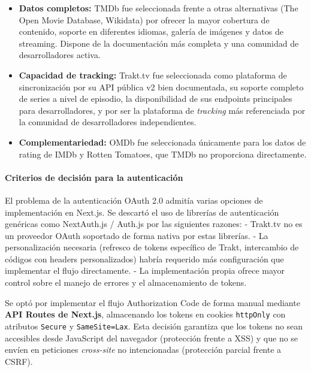 \documentclass[
]{article}
\providecommand{\tightlist}{%
  \setlength{\itemsep}{0pt}\setlength{\parskip}{0pt}}
\begin{document}
\begin{itemize}
\tightlist
\item
  \textbf{Datos completos:} TMDb fue seleccionada frente a otras
  alternativas (The Open Movie Database, Wikidata) por ofrecer la mayor
  cobertura de contenido, soporte en diferentes idiomas, galería de
  imágenes y datos de streaming. Dispone de la documentación más
  completa y una comunidad de desarrolladores activa.\\
\item
  \textbf{Capacidad de tracking:} Trakt.tv fue seleccionada como
  plataforma de sincronización por su API pública v2 bien documentada,
  su soporte completo de series a nivel de episodio, la disponibilidad
  de sus endpoints principales para desarrolladores, y por ser la
  plataforma de \emph{tracking} más referenciada por la comunidad de
  desarrolladores independientes.\\
\item
  \textbf{Complementariedad:} OMDb fue seleccionada únicamente para los
  datos de rating de IMDb y Rotten Tomatoes, que TMDb no proporciona
  directamente.
\end{itemize}

\hypertarget{criterios-de-decisiuxf3n-para-la-autenticaciuxf3n}{%
\paragraph{Criterios de decisión para la
autenticación}\label{criterios-de-decisiuxf3n-para-la-autenticaciuxf3n}}

El problema de la autenticación OAuth 2.0 admitía varias opciones de
implementación en Next.js. Se descartó el uso de librerías de
autenticación genéricas como NextAuth.js / Auth.js por las siguientes
razones: - Trakt.tv no es un proveedor OAuth soportado de forma nativa
por estas librerías. - La personalización necesaria (refresco de tokens
específico de Trakt, intercambio de códigos con headers personalizados)
habría requerido más configuración que implementar el flujo
directamente. - La implementación propia ofrece mayor control sobre el
manejo de errores y el almacenamiento de tokens.

Se optó por implementar el flujo Authorization Code de forma manual
mediante \textbf{API Routes de Next.js}, almacenando los tokens en
cookies \texttt{httpOnly} con atributos \texttt{Secure} y
\texttt{SameSite=Lax}. Esta decisión garantiza que los tokens no sean
accesibles desde JavaScript del navegador (protección frente a XSS) y
que no se envíen en peticiones \emph{cross-site} no intencionadas
(protección parcial frente a CSRF).
\end{document}
